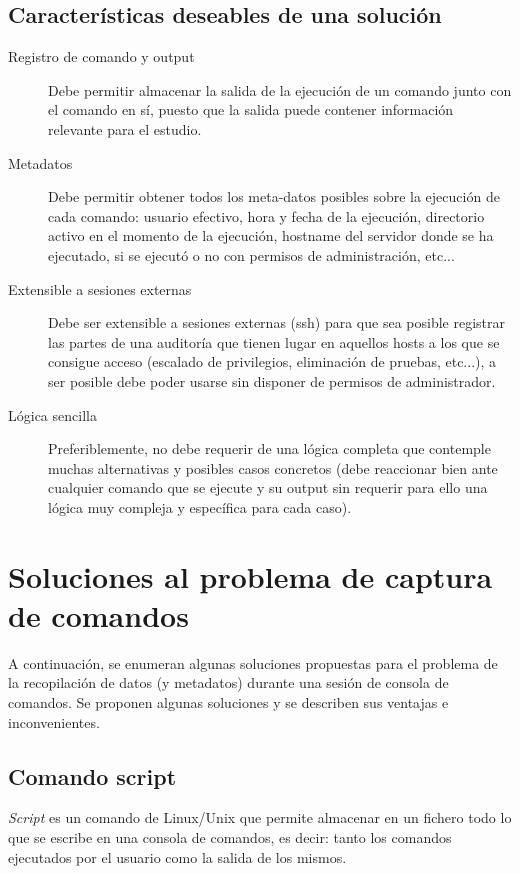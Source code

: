\subsection{Características deseables de una solución}

\begin{description}
    \item [Registro de comando y output] Debe permitir almacenar la salida de la ejecución de un comando junto con el comando en sí, puesto que la salida puede contener información relevante para el estudio.
    \item [Metadatos] Debe permitir obtener todos los meta-datos posibles sobre la ejecución de cada comando: usuario efectivo, hora y fecha de la ejecución, directorio activo en el momento de la ejecución, hostname del servidor donde se ha ejecutado, si se ejecutó o no con permisos de administración, etc...
    \item [Extensible a sesiones externas] Debe ser extensible a sesiones externas (ssh) para que sea posible registrar las partes de una auditoría que tienen lugar en aquellos hosts a los que se consigue acceso (escalado de privilegios, eliminación de pruebas, etc...), a ser posible debe poder usarse sin disponer de permisos de administrador.
    \item [Lógica sencilla] Preferiblemente, no debe requerir de una lógica completa que contemple muchas alternativas y posibles casos concretos (debe reaccionar bien ante cualquier comando que se ejecute y su output sin requerir para ello una lógica muy compleja y específica para cada caso).
\end{description}

\section{Soluciones al problema de captura de comandos}

A continuación, se enumeran algunas soluciones propuestas para el problema de la recopilación de datos (y metadatos) durante una sesión de consola de comandos. Se proponen algunas soluciones y se describen sus ventajas e inconvenientes.

\subsection{Comando script}

\textit{Script} es un comando de Linux/Unix que permite almacenar en un fichero todo lo que se escribe en una consola de comandos, es decir: tanto los comandos ejecutados por el usuario como la salida de los mismos.

